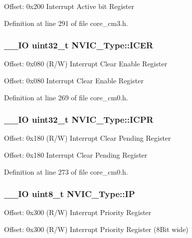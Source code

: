 Offset\-: 0x200 Interrupt Active bit Register 

Definition at line 291 of file core\-\_\-cm3.\-h.

\hypertarget{struct_n_v_i_c___type_a856fba9cb1acc608fc03d8f2451bb16a}{
\subsubsection[{I\-C\-E\-R}]{\setlength{\rightskip}{0pt plus 5cm}\-\_\-\-\_\-\-I\-O {\bf uint32\-\_\-t} N\-V\-I\-C\-\_\-\-Type\-::\-I\-C\-E\-R}}\label{struct_n_v_i_c___type_a856fba9cb1acc608fc03d8f2451bb16a}
Offset\-: 0x080 (R/\-W) Interrupt Clear Enable Register

Offset\-: 0x080 Interrupt Clear Enable Register 

Definition at line 269 of file core\-\_\-cm0.\-h.

\hypertarget{struct_n_v_i_c___type_a7483899bfdf859f059384dd9aacd0072}{
\subsubsection[{I\-C\-P\-R}]{\setlength{\rightskip}{0pt plus 5cm}\-\_\-\-\_\-\-I\-O {\bf uint32\-\_\-t} N\-V\-I\-C\-\_\-\-Type\-::\-I\-C\-P\-R}}\label{struct_n_v_i_c___type_a7483899bfdf859f059384dd9aacd0072}
Offset\-: 0x180 (R/\-W) Interrupt Clear Pending Register

Offset\-: 0x180 Interrupt Clear Pending Register 

Definition at line 273 of file core\-\_\-cm0.\-h.

\hypertarget{struct_n_v_i_c___type_aa7d4c60e9bbf4b3d07a6b3ba39a7d7d9}{
\subsubsection[{I\-P}]{\setlength{\rightskip}{0pt plus 5cm}\-\_\-\-\_\-\-I\-O {\bf uint8\-\_\-t} N\-V\-I\-C\-\_\-\-Type\-::\-I\-P}}\label{struct_n_v_i_c___type_aa7d4c60e9bbf4b3d07a6b3ba39a7d7d9}
Offset\-: 0x300 (R/\-W) Interrupt Priority Register

Offset\-: 0x300 (R/\-W) Interrupt Priority Register (8\-Bit wide)

